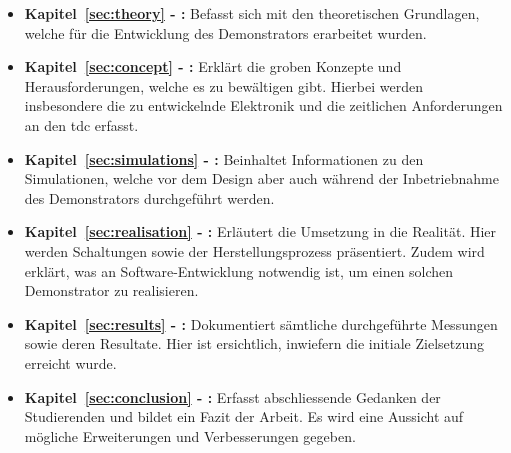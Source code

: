 \begin{itemize}
    \item \textbf{Kapitel~\ref{sec:theory} - :} Befasst sich mit den theoretischen Grundlagen,
          welche für die Entwicklung des Demonstrators erarbeitet wurden.

    \item \textbf{Kapitel~\ref{sec:concept} - :} Erklärt die groben Konzepte und Herausforderungen,
          welche es zu bewältigen gibt. Hierbei werden insbesondere die zu entwickelnde Elektronik und die zeitlichen
          Anforderungen an den \acrshort{tdc} erfasst.

    \item \textbf{Kapitel~\ref{sec:simulations} - :} Beinhaltet Informationen zu den
          Simulationen, welche vor dem Design aber auch während der Inbetriebnahme des Demonstrators durchgeführt werden.

    \item \textbf{Kapitel~\ref{sec:realisation} - :} Erläutert die Umsetzung in die Realität.
          Hier werden Schaltungen sowie der Herstellungsprozess präsentiert. Zudem wird erklärt, was an
          Software-Entwicklung notwendig ist, um einen solchen Demonstrator zu realisieren.

    \item \textbf{Kapitel~\ref{sec:results} - :} Dokumentiert sämtliche durchgeführte Messungen
          sowie deren Resultate. Hier ist ersichtlich, inwiefern die initiale Zielsetzung erreicht wurde.

    \item \textbf{Kapitel~\ref{sec:conclusion} - :} Erfasst abschliessende Gedanken der
          Studierenden und bildet ein Fazit der Arbeit. Es wird eine Aussicht auf mögliche Erweiterungen und
          Verbesserungen gegeben.
\end{itemize}
